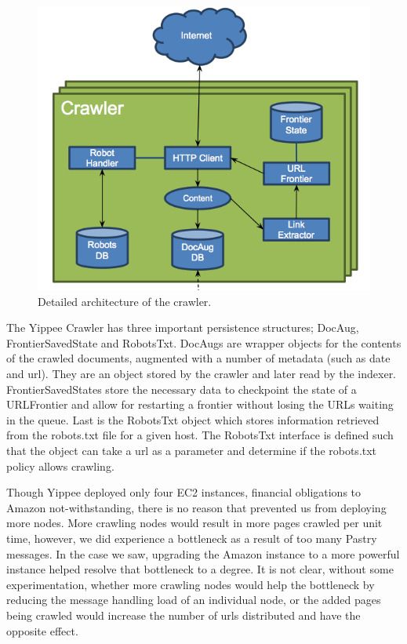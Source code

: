 \documentclass[11pt, letterpaper, oneside, twocolumn]{article}
\begin{document}
\label{sec:Crawler}
\begin{figure}[!b]
  \centering
  \includegraphics[scale=0.35]{figures/crawler_diagram.png}
  \caption{Detailed architecture of the crawler.}
\end{figure}


The Yippee Crawler has three important persistence structures; DocAug, FrontierSavedState and RobotsTxt.
DocAugs are wrapper objects for the contents of the crawled documents, augmented with a number of metadata (such as date and url).
They are an object stored by the crawler and later read by the indexer.
FrontierSavedStates store the necessary data to checkpoint the state of a URLFrontier and allow for restarting a frontier without losing the URLs waiting in the queue.
Last is the RobotsTxt object which stores information retrieved from the robots.txt file for a given host.
The RobotsTxt interface is defined such that the object can take a url as a parameter and determine if the robots.txt policy allows crawling.

Though Yippee deployed only four EC2 instances, financial obligations to Amazon not-withstanding, there is no reason that prevented us from deploying more nodes.
More crawling nodes would result in more pages crawled per unit time, however, we did experience a bottleneck as a result of too many Pastry messages.
In the case we saw, upgrading the Amazon instance to a more powerful instance helped resolve that bottleneck to a degree.
It is not clear, without some experimentation, whether more crawling nodes would help the bottleneck by reducing the message handling load of an individual node, or the added pages being crawled would increase the number of urls distributed and have the opposite effect.
\end{document}
